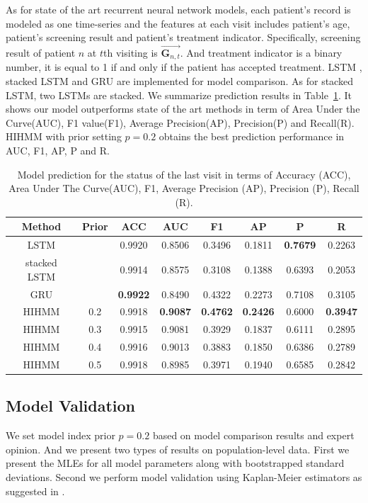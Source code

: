 \documentclass{article}
\begin{document}
As for state of the art recurrent neural network models, each patient's record is modeled as one time-series and the features at each visit includes patient's age, patient's screening result and patient's treatment indicator. Specifically, screening result of patient $n$ at $t$th visiting is $\vec{\bm G_{n,t}}$. And treatment indicator is a binary number, it is equal to 1 if and only if the patient has accepted treatment. LSTM \citep{Cho_2014}, stacked LSTM \citep{Dyer_2015} and GRU \citep{Chung_2014} are implemented for model comparison. As for stacked LSTM, two LSTMs are stacked. We summarize prediction results in Table~\ref{Model_Comparison}. It shows our model outperforms state of the art methods in term of Area Under the Curve(AUC), F1 value(F1), Average Precision(AP), Precision(P) and Recall(R). HIHMM with prior setting $p = 0.2$ obtains the best prediction performance in AUC, F1, AP, P and R.

\begin{table}[ht!]
	\centering
	\caption{Model prediction for the status of the last visit in terms of Accuracy (ACC), Area Under The Curve(AUC), F1, Average Precision (AP), Precision (P), Recall (R).}
	\begin{tabular}{|c|c|c|c|c|c|c|c|}
		\hline
		Method & Prior & ACC & AUC & F1 & AP & P & R \\
		\hline
		LSTM &  & 0.9920 & 0.8506 & 0.3496 & 0.1811 & \textbf{0.7679} & 0.2263 \\
		\hline
		stacked LSTM &  & 0.9914 & 0.8575 & 0.3108 & 0.1388 & 0.6393 & 0.2053 \\
		\hline
		GRU &  & \textbf{0.9922} & 0.8490 & 0.4322 & 0.2273 & 0.7108 & 0.3105 \\
		\hline
		HIHMM & 0.2 & 0.9918 & \textbf{0.9087} & \textbf{0.4762} & \textbf{0.2426} & 0.6000 & \textbf{0.3947} \\
		\hline
		HIHMM & 0.3 & 0.9915 & 0.9081 & 0.3929 & 0.1837 & 0.6111 & 0.2895 \\
		\hline
		HIHMM & 0.4 & 0.9916 & 0.9013 & 0.3883 & 0.1850 & 0.6386 & 0.2789 \\
		\hline
		HIHMM & 0.5 & 0.9918 & 0.8985 & 0.3971 & 0.1940 & 0.6585 & 0.2842 \\
		\hline
	\end{tabular}
	\label{Model_Comparison}
\end{table}


\subsection{Model Validation}
We set model index prior $p = 0.2$ based on model comparison results and expert opinion. And we present two types of results on population-level data. First we present the MLEs for all model parameters along with bootstrapped standard deviations. Second we perform model validation using Kaplan-Meier estimators as suggested in \cite{titman_general_2008}.
\end{document}
